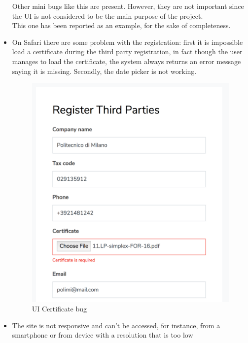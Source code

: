 \begin{itemize}
Other mini bugs like this are present. However, they are not important since the 
UI is not considered to be the main purpose of the project. \\
This one has been reported as an example, for the sake of completeness.

\item 
On Safari there are some problem with the registration: first it is impossible load a
certificate during the third party registration, in fact though the user manages to load the
certificate, the system always returns an error message saying it is missing. Secondly, the
date picker is not working.

\begin{figure}[H]
\includegraphics[width=0.6\linewidth]{images/certificateBug}
\centering
\caption{ UI Certificate bug }
\label{fig:certificatebug}
\end{figure}

\item 
The site is not responsive and can't be accessed, for instance, from a smartphone or from device with a resolution that is too low

\end{itemize}
